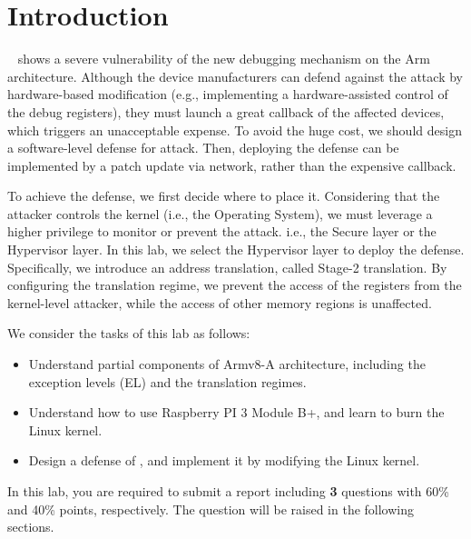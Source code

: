 \section{Introduction}
\label{sec:intro}


\TheName{}~\cite{ning2019understanding} shows a severe vulnerability of the new debugging mechanism on the Arm architecture.
Although the device manufacturers can defend against the attack by hardware-based modification (e.g., implementing a hardware-assisted control of the debug registers),
they must launch a great callback of the affected devices, which triggers an unacceptable expense.
To avoid the huge cost, we should design a software-level defense for \TheName{} attack.
Then, deploying the defense can be implemented by a patch update via network, rather than the expensive callback.

To achieve the defense, we first decide where to place it.
Considering that the attacker controls the kernel (i.e., the Operating System),
we must leverage a higher privilege to monitor or prevent the \TheName{} attack. i.e., the Secure layer or the Hypervisor layer.
In this lab, we select the Hypervisor layer to deploy the defense. Specifically, we introduce an address translation, called Stage-2 translation. By configuring the translation regime, we prevent the access of the registers from the kernel-level attacker, while the access of other memory regions is unaffected.

We consider the tasks of this lab as follows:

\begin{itemize}
	\item Understand partial components of Armv8-A architecture, including the exception levels (EL) and the translation regimes.
	\item Understand how to use Raspberry PI 3 Module B+, and learn to burn the Linux kernel.
	\item Design a defense of \TheName{}, and implement it by modifying the Linux kernel. 
\end{itemize}

In this lab, you are required to submit a report including \textbf{3} questions with 60\% and 40\% points, respectively. The question will be raised in the following sections.